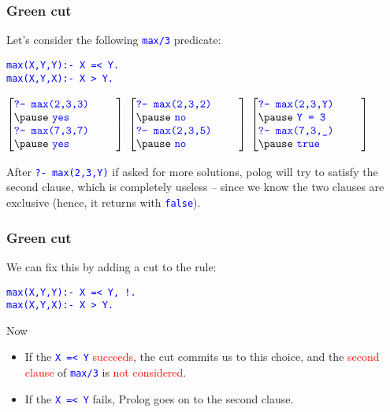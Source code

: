\documentclass[xcolor=x11names]{beamer}
\newcommand{\cemph}[1]{\textcolor{red}{#1}}
\newcommand\ol[1]{\textcolor{blue}{\texttt{#1}}}
\begin{document}
\begin{frame}[t]
\frametitle{Green cut}

Let's consider the following \ol{max/3} predicate:
\vspace{.3cm}

\ol{max(X,Y,Y):- X =< Y.}\\
\ol{max(X,Y,X):- X > Y.}
\vspace{1cm}
\pause

$\left[ \begin{minipage}{.27\textwidth}
\vspace{.1cm}
\ol{?- max(2,3,3)}\\
\pause
\ol{yes}\\

\ol{?- max(7,3,7)}\\
\pause
\ol{yes}
\vspace{.1cm}
\end{minipage}\right] $
\pause
$\left[ \begin{minipage}{.27\textwidth}
\vspace{.1cm}
\ol{?- max(2,3,2)}\\
\pause
\ol{no}\\

\ol{?- max(2,3,5)}\\
\pause
\ol{no}
\vspace{.1cm}
\end{minipage}\right] $
\pause
$\left[ \begin{minipage}{.27\textwidth}
\vspace{.1cm}
\ol{?- max(2,3,Y)}\\
\pause
\ol{Y = 3}\\

\ol{?- max(7,3,\_)}\\
\pause
\ol{true}
\vspace{.1cm}
\end{minipage}\right] $
\vspace{1cm}
\pause

After \ol{?- max(2,3,Y)} if asked for more solutions, polog will try to satisfy the second clause, which is completely useless -- since we know the two clauses are exclusive (hence, it returns with \ol{false}).

\end{frame}

\begin{frame}[t]
\frametitle{Green cut}

We can fix this by adding a cut to the rule:
\vspace{.5cm}

\ol{max(X,Y,Y):- X =< Y, !.}\\
\ol{max(X,Y,X):- X > Y.}
\vspace{.5cm}
\pause

Now
\begin{itemize}
\item If the \ol{X =< Y} \cemph{succeeds}, the cut commits us to this choice, and the \cemph{second clause} of \ol{max/3} is \cemph{not considered}.
\item If the \ol{X =< Y} fails, Prolog goes on to the second clause.
\end{itemize}

\end{frame}
\end{document}

